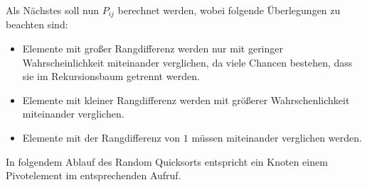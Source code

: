 \documentclass{scrartcl}%
\begin{document}
    Als Nächstes soll nun $P_{ij}$ berechnet werden, wobei folgende Überlegungen zu beachten sind:
    \begin{itemize}
        \item Elemente mit großer Rangdifferenz werden nur mit geringer Wahrscheinlichkeit miteinander verglichen,
        da viele Chancen bestehen, dass sie im Rekursionsbaum getrennt werden.
        \item Elemente mit kleiner Rangdifferenz werden mit größerer Wahrschenlichkeit miteinander verglichen.
        \item Elemente mit der Rangdifferenz von $1$ müssen miteinander verglichen werden.
    \end{itemize}

    In folgendem Ablauf des Random Quicksorts entspricht ein Knoten einem Pivotelement im entsprechenden Aufruf.
\end{document}
